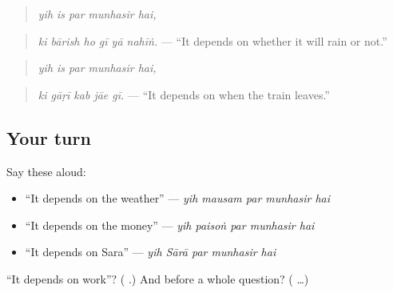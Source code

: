 \begin{quote}
\emph{yih is par munhasir hai,}
\end{quote}

\begin{quote}
\textbf{     }
\end{quote}

\begin{quote}
\emph{ki bārish ho gī yā nahīṅ.} — \textquotedblleft{}It depends on whether it will rain or not.\textquotedblright{}
\end{quote}

\begin{quote}
\textbf{    }
\end{quote}

\begin{quote}
\emph{yih is par munhasir hai,}
\end{quote}

\begin{quote}
\textbf{    }
\end{quote}

\begin{quote}
\emph{ki gāṛī kab jāe gī.} — \textquotedblleft{}It depends on when the train leaves.\textquotedblright{}
\end{quote}

\subsection*{Your turn}
Say these aloud:

\begin{itemize}
\raggedright
  \item \textquotedblleft{}It depends on the weather\textquotedblright{} — \emph{yih mausam par munhasir hai}
  \item \textquotedblleft{}It depends on the money\textquotedblright{} — \emph{yih paisoṅ par munhasir hai}
  \item \textquotedblleft{}It depends on Sara\textquotedblright{} — \emph{yih Sārā par munhasir hai}
\end{itemize}

\begin{tcolorbox}[breakable,colback=teal!4,colframe=teal!35!black,title={Before you move on}]
\textquotedblleft{}It depends on work\textquotedblright{}? (\textbf{    }.) And before a whole question? (\textbf{     } …)
\end{tcolorbox}
